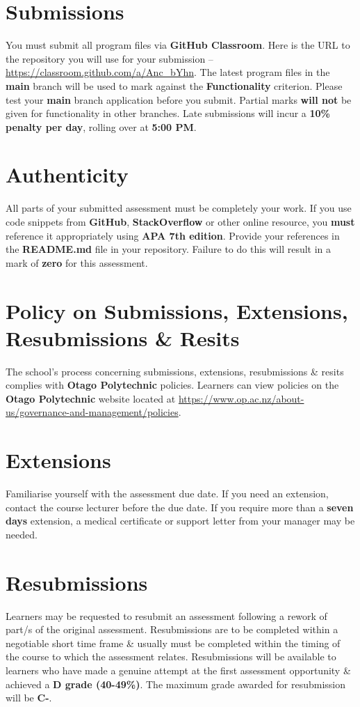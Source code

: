 \documentclass{article}
\begin{document}
\section*{Submissions}
You must submit all program files via \textbf{GitHub Classroom}. Here is the URL to the repository you will use for your submission – \href{https://classroom.github.com/a/Anc\_bYhn}{https://classroom.github.com/a/Anc\_bYhn}. The latest program files in the \textbf{main} branch will be used to mark against the \textbf{Functionality} criterion. Please test your \textbf{main} branch application before you submit. Partial marks \textbf{will not} be given for functionality in other branches. Late submissions will incur a \textbf{10\% penalty per day}, rolling over at \textbf{5:00 PM}.

\section*{Authenticity}
All parts of your submitted assessment must be completely your work. If you use code snippets from \textbf{GitHub}, \textbf{StackOverflow} or other online resource, you \textbf{must} reference it appropriately using \textbf{APA 7th edition}. Provide your references in the \textbf{README.md} file in your repository. Failure to do this will result in a mark of \textbf{zero} for this assessment.

\section*{Policy on Submissions, Extensions, Resubmissions \& Resits}
The school's process concerning submissions, extensions, resubmissions \& resits complies with \textbf{Otago Polytechnic} policies. Learners can view policies on the \textbf{Otago Polytechnic} website located at \href{https://www.op.ac.nz/about-us/governance-and-management/policies}{https://www.op.ac.nz/about-us/governance-and-management/policies}.

\section*{Extensions}
Familiarise yourself with the assessment due date. If you need an extension, contact the course lecturer before the due date. If you require more than a \textbf{seven days} extension, a medical certificate or support letter from your manager may be needed.

\section*{Resubmissions}
Learners may be requested to resubmit an assessment following a rework of part/s of the original assessment. Resubmissions are to be completed within a negotiable short time frame \& usually must be completed within the timing of the course to which the assessment relates. Resubmissions will be available to learners who have made a genuine attempt at the first assessment opportunity \& achieved a \textbf{D grade (40-49\%)}. The maximum grade awarded for resubmission will be \textbf{C-}.
\end{document}

